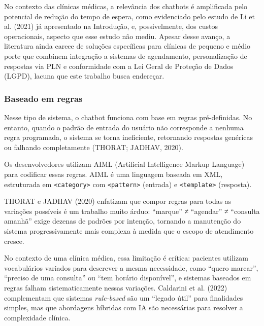 \documentclass[12pt,a4paper]{extarticle}
\begin{document}
No contexto das clínicas médicas, a relevância dos chatbots é amplificada pelo potencial de redução do tempo de espera, como evidenciado pelo estudo de Li et al. (2021) já apresentado na Introdução, e, possivelmente, dos custos operacionais, aspecto que esse estudo não mediu. Apesar desse avanço, a literatura ainda carece de soluções específicas para clínicas de pequeno e médio porte que combinem integração a sistemas de agendamento, personalização de respostas via PLN e conformidade com a Lei Geral de Proteção de Dados (LGPD), lacuna que este trabalho busca endereçar.

\subsubsection{Baseado em regras}
\label{sec:regras}

Nesse tipo de sistema, o chatbot funciona com base em regras pré-definidas. No entanto, quando o padrão de entrada do usuário não corresponde a nenhuma regra programada, o sistema se torna ineficiente, retornando respostas genéricas ou falhando completamente (THORAT; JADHAV, 2020).

Os desenvolvedores utilizam AIML (Artificial Intelligence Markup Language) para codificar essas regras. AIML é uma linguagem baseada em XML, estruturada em \texttt{<category>} com \texttt{<pattern>} (entrada) e \texttt{<template>} (resposta).

THORAT e JADHAV (2020) enfatizam que compor regras para todas as variações possíveis é um trabalho muito árduo: ``marque'' ≠ ``agendar'' ≠ ``consulta amanhã'' exige dezenas de padrões por intenção, tornando a manutenção do sistema progressivamente mais complexa à medida que o escopo de atendimento cresce.

No contexto de uma clínica médica, essa limitação é crítica: pacientes utilizam vocabulários variados para descrever a mesma necessidade, como ``quero marcar'', ``preciso de uma consulta'' ou ``tem horário disponível'', e sistemas baseados em regras falham sistematicamente nessas variações. Caldarini et al. (2022) complementam que sistemas \textit{rule-based} são um ``legado útil'' para finalidades simples, mas que abordagens híbridas com IA são necessárias para resolver a complexidade clínica.
\end{document}
